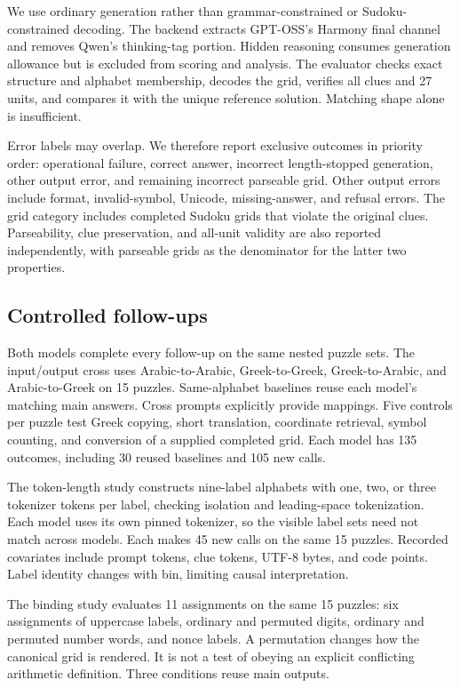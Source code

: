 \documentclass[11pt]{article}
\begin{document}
We use ordinary generation rather than grammar-constrained or Sudoku-constrained decoding. The backend extracts GPT-OSS's Harmony final channel and removes Qwen's thinking-tag portion. Hidden reasoning consumes generation allowance but is excluded from scoring and analysis. The evaluator checks exact structure and alphabet membership, decodes the grid, verifies all clues and 27 units, and compares it with the unique reference solution. Matching shape alone is insufficient.

Error labels may overlap. We therefore report exclusive outcomes in priority order: operational failure, correct answer, incorrect length-stopped generation, other output error, and remaining incorrect parseable grid. Other output errors include format, invalid-symbol, Unicode, missing-answer, and refusal errors. The grid category includes completed Sudoku grids that violate the original clues. Parseability, clue preservation, and all-unit validity are also reported independently, with parseable grids as the denominator for the latter two properties.

\subsection{Controlled follow-ups}
Both models complete every follow-up on the same nested puzzle sets. The input/output cross uses Arabic-to-Arabic, Greek-to-Greek, Greek-to-Arabic, and Arabic-to-Greek on 15 puzzles. Same-alphabet baselines reuse each model's matching main answers. Cross prompts explicitly provide mappings. Five controls per puzzle test Greek copying, short translation, coordinate retrieval, symbol counting, and conversion of a supplied completed grid. Each model has 135 outcomes, including 30 reused baselines and 105 new calls.

The token-length study constructs nine-label alphabets with one, two, or three tokenizer tokens per label, checking isolation and leading-space tokenization. Each model uses its own pinned tokenizer, so the visible label sets need not match across models. Each makes 45 new calls on the same 15 puzzles. Recorded covariates include prompt tokens, clue tokens, UTF-8 bytes, and code points. Label identity changes with bin, limiting causal interpretation.

The binding study evaluates 11 assignments on the same 15 puzzles: six assignments of uppercase labels, ordinary and permuted digits, ordinary and permuted number words, and nonce labels. A permutation changes how the canonical grid is rendered. It is not a test of obeying an explicit conflicting arithmetic definition. Three conditions reuse main outputs.
\end{document}
